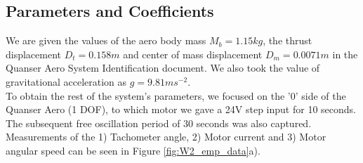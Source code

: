 \documentclass[11pt]{article}
\begin{document}
\subsection{Parameters and Coefficients}
We are given the values of the aero body mass $M_b = 1.15kg$, the thrust displacement $D_t = 0.158m$ and center of mass displacement $D_m = 0.0071m$ in the Quanser Aero System Identification document. We also took the value of gravitational acceleration as $g = 9.81m s^{-2}$.\\
To obtain the rest of the system's parameters, we focused on the '0' side of the Quanser Aero (1 DOF), to which motor we gave a 24V step input for 10 seconds. The subsequent free oscillation period of 30 seconds was also captured. Measurements of the 1) Tachometer angle, 2) Motor current and 3) Motor angular speed can be seen in Figure \ref{fig:W2_emp_data}a).
\end{document}
